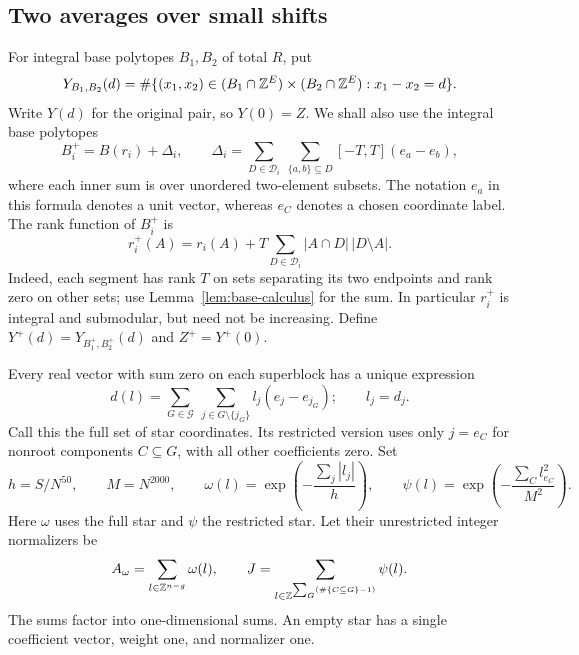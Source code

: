 \subsection{Two averages over small shifts}

For integral base polytopes \(B_1,B_2\) of total \(R\), put
\[
 Y_{B_1,B_2}(d)=
 \#\{(x_1,x_2)\in(B_1\cap\mathbb Z^E)\times(B_2\cap\mathbb Z^E):
                  x_1-x_2=d\}.
\]
Write \(Y(d)\) for the original pair, so \(Y(0)=Z\).
We shall also use the integral base polytopes
\begin{equation}\label{eq:expanded-bases}
 B_i^+=B(r_i)+\Delta_i,\qquad
 \Delta_i=
 \sum_{D\in\mathcal D_i}\ \sum_{\{a,b\}\subseteq D}
                 [-T,T](e_a-e_b),
\end{equation}
where each inner sum is over unordered two-element subsets.
The notation \(e_a\) in this formula denotes a unit vector, whereas
\(e_C\) denotes a chosen coordinate label.  The rank function of
\(B_i^+\) is
\begin{equation}\label{eq:expanded-rank}
 r_i^+(A)=r_i(A)+T\sum_{D\in\mathcal D_i}
                         |A\cap D|\,|D\setminus A|.
\end{equation}
Indeed, each segment has rank \(T\) on sets separating its two
endpoints and rank zero on other sets; use
Lemma~\ref{lem:base-calculus} for the sum.  In particular
\(r_i^+\) is integral and submodular, but need not be increasing.
Define \(Y^+(d)=Y_{B_1^+,B_2^+}(d)\) and \(Z^+=Y^+(0)\).

Every real vector with sum zero on each superblock has a unique
expression
\begin{equation}\label{eq:star-coordinates}
 d(l)=\sum_{G\in\mathcal G}\ \sum_{j\in G\setminus\{j_G\}}
                         l_j(e_j-e_{j_G});
 \qquad l_j=d_j.
\end{equation}
Call this the full set of star coordinates.  Its restricted version
uses only \(j=e_C\) for nonroot components \(C\subseteq G\),
with all other coefficients zero.  Set
\begin{equation}\label{eq:shift-kernels}
 h=S/N^{50},\qquad M=N^{2000},\qquad
 \omega(l)=\exp\left(-\frac{\sum_j|l_j|}{h}\right),\qquad
 \psi(l)=\exp\left(-\frac{\sum_C l_{e_C}^2}{M^2}\right).
\end{equation}
Here \(\omega\) uses the full star and \(\psi\) the restricted
star.  Let their unrestricted integer normalizers be
\begin{equation}\label{eq:shift-normalizers}
 A_\omega=\sum_{l\in\mathbb Z^{n-g}}\omega(l),\qquad
 J=\sum_{l\in\mathbb Z^{\sum_G(\#\{C\subseteq G\}-1)}}\psi(l).
\end{equation}
The sums factor into one-dimensional sums.  An empty star has a
single coefficient vector, weight one, and normalizer one.

